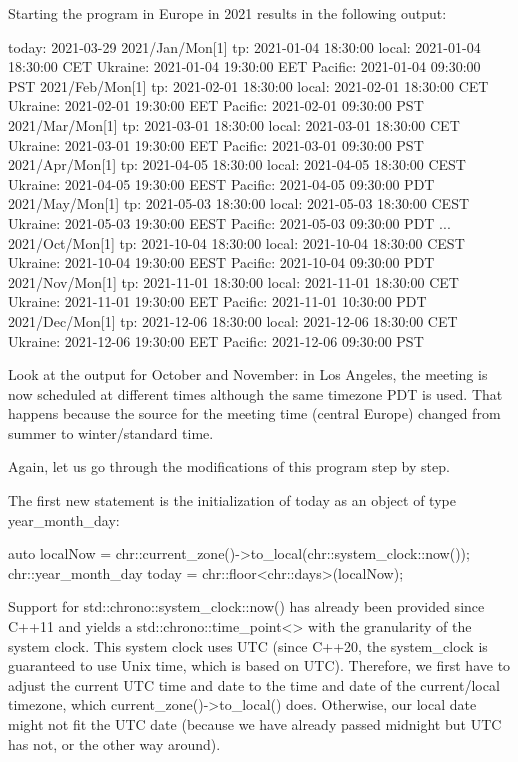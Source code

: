 Starting the program in Europe in 2021 results in the following output:

\begin{shell}
today: 2021-03-29
2021/Jan/Mon[1]
    tp:      2021-01-04 18:30:00
    local:   2021-01-04 18:30:00 CET
    Ukraine: 2021-01-04 19:30:00 EET
    Pacific: 2021-01-04 09:30:00 PST
2021/Feb/Mon[1]
    tp:      2021-02-01 18:30:00
    local:   2021-02-01 18:30:00 CET
    Ukraine: 2021-02-01 19:30:00 EET
    Pacific: 2021-02-01 09:30:00 PST
2021/Mar/Mon[1]
    tp:      2021-03-01 18:30:00
    local:   2021-03-01 18:30:00 CET
    Ukraine: 2021-03-01 19:30:00 EET
    Pacific: 2021-03-01 09:30:00 PST
2021/Apr/Mon[1]
    tp:      2021-04-05 18:30:00
    local:   2021-04-05 18:30:00 CEST
    Ukraine: 2021-04-05 19:30:00 EEST
    Pacific: 2021-04-05 09:30:00 PDT
2021/May/Mon[1]
    tp:      2021-05-03 18:30:00
    local:   2021-05-03 18:30:00 CEST
    Ukraine: 2021-05-03 19:30:00 EEST
    Pacific: 2021-05-03 09:30:00 PDT
...
2021/Oct/Mon[1]
    tp:      2021-10-04 18:30:00
    local:   2021-10-04 18:30:00 CEST
    Ukraine: 2021-10-04 19:30:00 EEST
    Pacific: 2021-10-04 09:30:00 PDT
2021/Nov/Mon[1]
    tp:      2021-11-01 18:30:00
    local:   2021-11-01 18:30:00 CET
    Ukraine: 2021-11-01 19:30:00 EET
    Pacific: 2021-11-01 10:30:00 PDT
2021/Dec/Mon[1]
    tp:      2021-12-06 18:30:00
    local:   2021-12-06 18:30:00 CET
    Ukraine: 2021-12-06 19:30:00 EET
    Pacific: 2021-12-06 09:30:00 PST
\end{shell}

Look at the output for October and November: in Los Angeles, the meeting is now scheduled at different times although the same timezone PDT is used. That happens because the source for the meeting time (central Europe) changed from summer to winter/standard time.

Again, let us go through the modifications of this program step by step.


The first new statement is the initialization of today as an object of type year\_month\_day:

\begin{cpp}
auto localNow = chr::current_zone()->to_local(chr::system_clock::now());
chr::year_month_day today = chr::floor<chr::days>(localNow);
\end{cpp}

Support for std::chrono::system\_clock::now() has already been provided since C++11 and yields a std::chrono::time\_point<> with the granularity of the system clock. This system clock uses UTC (since C++20, the system\_clock is guaranteed to use Unix time, which is based on UTC). Therefore, we first have to adjust the current UTC time and date to the time and date of the current/local timezone, which current\_zone()->to\_local() does. Otherwise, our local date might not fit the UTC date (because we have already passed midnight but UTC has not, or the other way around).

